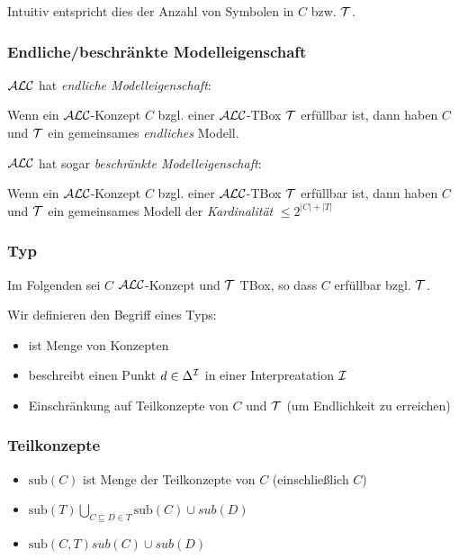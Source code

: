 Intuitiv entspricht dies der Anzahl von Symbolen in $C$ bzw. $\mathcal{T}$.

\subsubsection{Endliche/beschränkte Modelleigenschaft}

$\mathcal{A}\mathcal{L}\mathcal{C}$ hat \emph{endliche Modelleigenschaft}:

\begin{theorem}
Wenn ein $\mathcal{A}\mathcal{L}\mathcal{C}$-Konzept $C$ bzgl. einer $\mathcal{A}\mathcal{L}\mathcal{C}$-TBox $\mathcal{T}$ erfüllbar ist, dann haben $C$ und $\mathcal{T}$ ein gemeinsames \emph{endliches} Modell.
\end{theorem}

$\mathcal{A}\mathcal{L}\mathcal{C}$ hat sogar \emph{beschränkte Modelleigenschaft}:

\begin{theorem}
Wenn ein $\mathcal{A}\mathcal{L}\mathcal{C}$-Konzept $C$ bzgl. einer $\mathcal{A}\mathcal{L}\mathcal{C}$-TBox $\mathcal{T}$ erfüllbar ist, dann haben $C$ und $\mathcal{T}$ ein gemeinsames Modell der \emph{Kardinalität} $\leq 2^{|C|+|T|}$
\end{theorem}

\subsubsection{Typ}

Im Folgenden sei $C$ $\mathcal{A}\mathcal{L}\mathcal{C}$-Konzept und $\mathcal{T}$ TBox, so dass $C$ erfüllbar bzgl. $\mathcal{T}$.

Wir definieren den Begriff eines Typs:

\begin{itemize}
  \item ist Menge von Konzepten
  \item beschreibt einen Punkt $d \in \Delta^{\mathcal{I}}$ in einer Interpreatation $\mathcal{I}$
  \item Einschränkung auf Teilkonzepte von $C$ und $\mathcal{T}$ (um Endlichkeit zu erreichen)
\end{itemize}

\subsubsection{Teilkonzepte}\label{teilkonzepte}

\begin{itemize}
\item
  $\text{sub}\left( C \right)$ ist Menge der Teilkonzepte von $C$
  (einschließlich $C$)
\item
  $\text{sub}\left( T \right) \bigcup_{C \sqsubseteq D \in T}^{}{\text{sub}\left( C \right) \cup sub\left( D \right)}$
\item
  $\text{sub}\left( C,T \right) sub\left( C \right) \cup sub\left( D \right)$
\end{itemize}

